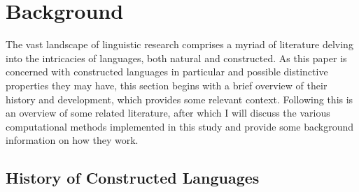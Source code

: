 \documentclass[12pt,a4paper]{article}
\numberwithin{figure}{section}
\numberwithin{table}{section}
\numberwithin{definition}{section}
\begin{document}
\newpage
\section{Background}
\label{sec:background}

The vast landscape of linguistic research comprises a myriad of literature delving into the intricacies of languages, both natural and constructed. As this paper is concerned with constructed languages in particular and possible distinctive properties they may have, this section begins with a brief overview of their history and development, which provides some relevant context. Following this is an overview of some related literature, after which I will discuss the various computational methods implemented in this study and provide some background information on how they work. 

\subsection{History of Constructed Languages}
\label{ssec:historyofconlangs}
\end{document}
